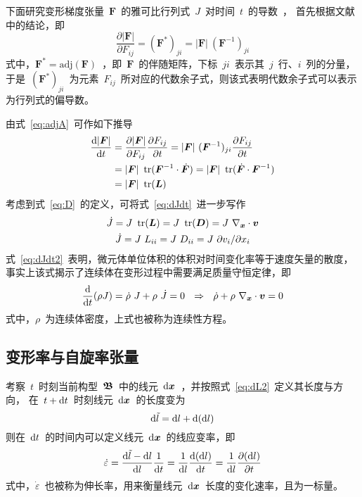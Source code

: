 下面研究变形梯度张量~$\bm{F}$~的雅可比行列式~$J$~对时间~$t$~的导数~，
首先根据文献\cite{shulijichu}中的结论，即
\begin{equation}\label{eq:adjA}
	\frac{\partial |\bm{F}|}{\partial F_{ij}} = (\bm{F}^*)_{ji} = |\bm{F}| ~ (\bm{F}^{-1})_{ji}
\end{equation}
式中，$\bm{F}^* = \mathrm{adj}(\bm{F})$~，即~$\bm{F}$~的伴随矩阵，下标~$ji$~表示其~$j$~行、$i$~列的分量，
于是~$(\bm{F}^*)_{ji}$~为元素~$F_{ij}$~所对应的代数余子式，则该式表明代数余子式可以表示为行列式的偏导数。

由式~\eqref{eq:adjA}~可作如下推导
\begin{equation} \label{eq:dJdt}
\begin{split}
	\frac{\mathop{}\!\mathrm{d} |\bm{F}|}{\mathop{}\!\mathrm{d} t} & = \frac{\partial |\bm{F}|}{\partial F_{ij}} \frac{\partial F_{ij}}{\partial t} 
									 = |\bm{F}| ~ (\bm{F}^{-1})_{ji} \frac{\partial F_{ij}}{\partial t}  \\
								   & = |\bm{F}| ~ \operatorname{tr}(\bm{F}^{-1} \cdot \dot{\bm{F}}) 
								     = |\bm{F}| ~ \operatorname{tr}(\dot{\bm{F}} \cdot \bm{F}^{-1})  \\
							       & = |\bm{F}| ~ \operatorname{tr}(\bm{L})
\end{split}
\end{equation}
考虑到式~\eqref{eq:D}~的定义，可将式~\eqref{eq:dJdt}~进一步写作
\begin{subequations} \label{eq:dJdt2}
\begin{gather}
	\dot{J} = J~ \operatorname{tr}(\bm{L}) = J~ \operatorname{tr}(\bm{D}) = J~ \nabla_{\bm{x}} \cdot \bm{v} \\
	\dot{J} = J~L_{ii} = J~D_{ii} = J~{\partial v_i}/{\partial x_i}
\end{gather}
\end{subequations}
式~\eqref{eq:dJdt2}~表明，微元体单位体积的体积对时间变化率等于速度矢量的散度，
事实上该式揭示了连续体在变形过程中需要满足质量守恒定律，即
\begin{equation}\label{eq:dJdt3}
	\frac{\mathop{}\!\mathrm{d}}{\mathop{}\!\mathrm{d} t}(\rho J) = \dot{\rho} ~J+\rho ~\dot{J} = 0 ~~\Rightarrow~~
	\dot{\rho}+\rho ~ \nabla_{\bm{x}} \cdot \bm{v} = 0
\end{equation}
式中，$\rho$~为连续体密度，上式也被称为连续性方程。

\subsection{变形率与自旋率张量}
考察~$t$~时刻当前构型~$\bm{\mathfrak{B}}$~中的线元~$\mathop{}\!\mathrm{d} \bm{x}$~，并按照式~\eqref{eq:dL2}~定义其长度与方向，
在~$t+\mathop{}\!\mathrm{d} t$~时刻线元~$\mathop{}\!\mathrm{d} \bm{x}$~的长度变为
\begin{equation}\label{eq:dL3}
	\mathop{}\!\mathrm{d} \tilde{l} =\mathop{}\!\mathrm{d} l +\mathop{}\!\mathrm{d} ( \mathop{}\!\mathrm{d} l )
\end{equation}
则在~$\mathop{}\!\mathrm{d} t$~的时间内可以定义线元~$\mathop{}\!\mathrm{d} \bm{x}$~的线应变率，即
\begin{equation}\label{eq:line_e}
	\dot{\varepsilon}=\frac{\diff \tilde{l}-\diff l}{\diff l} \frac{1}{\diff t}=\frac{1}{\diff l} \frac{\diff (\diff l)}{\diff t} =
	\frac{1}{\diff l} \frac{\partial (\diff l)}{\partial t}
\end{equation}
式中，$\dot{\varepsilon}$~也被称为伸长率，用来衡量线元~$\mathop{}\!\mathrm{d} \bm{x}$~长度的变化速率，且为一标量。


